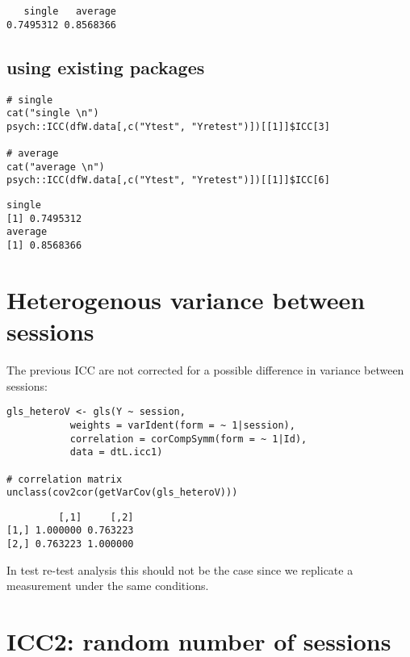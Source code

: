 \documentclass{article}
\begin{document}
\begin{verbatim}
   single   average 
0.7495312 0.8568366
\end{verbatim}

\bigskip

\subsection{using existing packages}
\label{sec:org6f62c7d}
\lstset{language=r,label= ,caption= ,captionpos=b,numbers=none}
\begin{lstlisting}
# single
cat("single \n")
psych::ICC(dfW.data[,c("Ytest", "Yretest")])[[1]]$ICC[3]

# average
cat("average \n")
psych::ICC(dfW.data[,c("Ytest", "Yretest")])[[1]]$ICC[6]
\end{lstlisting}

\begin{verbatim}
single
[1] 0.7495312
average
[1] 0.8568366
\end{verbatim}

\section{Heterogenous variance between sessions}
\label{sec:org3e20e15}

The previous ICC are not corrected for a possible difference in
variance between sessions:
\lstset{language=r,label= ,caption= ,captionpos=b,numbers=none}
\begin{lstlisting}
gls_heteroV <- gls(Y ~ session, 
		   weights = varIdent(form = ~ 1|session),
		   correlation = corCompSymm(form = ~ 1|Id), 
		   data = dtL.icc1)

# correlation matrix
unclass(cov2cor(getVarCov(gls_heteroV)))
\end{lstlisting}

\begin{verbatim}
         [,1]     [,2]
[1,] 1.000000 0.763223
[2,] 0.763223 1.000000
\end{verbatim}

In test re-test analysis this should not be the case since we
replicate a measurement under the same conditions.

\clearpage


\section{ICC2: random number of sessions}
\label{sec:org1686ca2}
\end{document}

